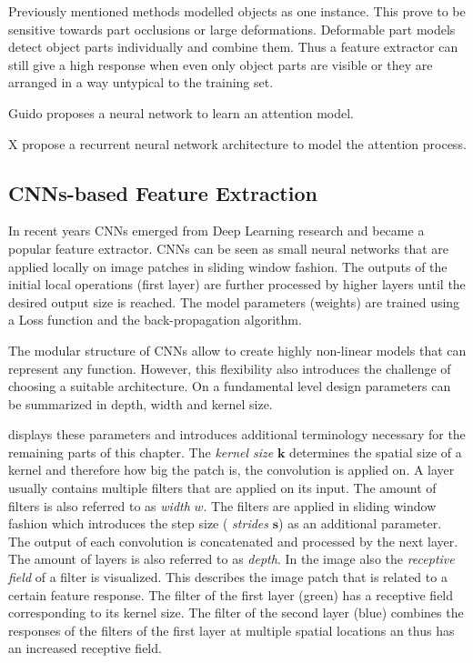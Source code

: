 	Previously mentioned methods modelled objects as one instance. This prove to be sensitive towards part occlusions or large deformations. Deformable part models detect object parts individually and combine them. Thus a feature extractor can still give a high response when even only object parts are visible or they are arranged in a way untypical to the training set.
	
	Guido proposes a neural network to learn an attention model.
	
	X propose a recurrent neural network architecture to model the attention process.
	
	
	\subsection{\acp{CNN}-based Feature Extraction}
	
	In recent years \acp{CNN} emerged from Deep Learning research and became a popular feature extractor. \acp{CNN} can be seen as small neural networks that are applied locally on image patches in sliding window fashion. The outputs of the initial local operations (first layer) are further processed by higher layers until the desired output size is reached. The model parameters (weights) are trained using a Loss function and the back-propagation algorithm.
	
	The modular structure of \acp{CNN} allow to create highly non-linear models that can represent any function. However, this flexibility also introduces the challenge of choosing a suitable architecture. On a fundamental level design parameters can be summarized in depth, width and kernel size. 
	
	 displays these parameters and introduces additional terminology necessary for the remaining parts of this chapter. The \textit{kernel size} $\textbf{k}$ determines the spatial size of a kernel and therefore how big the patch is, the convolution is applied on. A layer usually contains multiple filters that are applied on its input. The amount of filters is also referred to as \textit{width} $w$. The filters are applied in sliding window fashion which introduces the step size ( \textit{strides} $\mathbf{s}$) as an additional parameter. The output of each convolution is concatenated and processed by the next layer. The amount of layers is also referred to as \textit{depth}. In the image also the \textit{receptive field} of a filter is visualized. This describes the image patch that is related to a certain feature response. The filter of the first layer (green) has a receptive field corresponding to its kernel size. The filter of the second layer (blue) combines the responses of the filters of the first layer at multiple spatial locations an thus has an increased receptive field.
	

